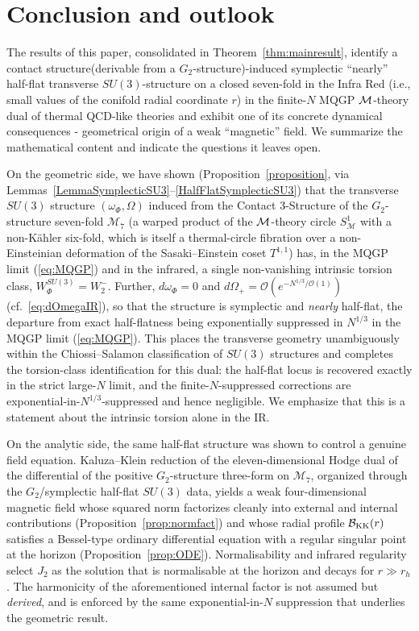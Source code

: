 \documentclass[a4paper,11pt,fleqn]{article}
\theoremstyle{plain}
\theoremstyle{definition}
\begin{document}
\section{Conclusion and outlook}
\label{Conclusion}

The results of this paper, consolidated in Theorem~\ref{thm:mainresult}, identify a contact structure(derivable from a $G_2$-structure)-induced symplectic ``nearly'' half-flat transverse
$SU(3)$-structure on a closed seven-fold in the Infra Red (i.e., small values of the conifold radial coordinate $r$) in the finite-$N$ MQGP ${\cal M}$-theory dual of thermal QCD-like theories and exhibit one of its concrete dynamical consequences - geometrical origin of a weak ``magnetic'' field. We summarize the
mathematical content and indicate the questions it leaves open.

On the geometric side, we have shown
(Proposition~\ref{proposition}, via
Lemmas~\ref{LemmaSymplecticSU3}--\ref{HalfFlatSymplecticSU3}) that the transverse $SU(3)$
structure $(\omega_\Phi,\Omega)$ induced from the Contact 3-Structure of the $G_2$-structure
seven-fold $\mathcal{M}_7$ (a warped product of the ${\cal M}$-theory circle $S^1_{\mathcal{M}}$ with a non-K\"{a}hler six-fold, which is itself a thermal-circle fibration over a non-Einsteinian deformation of the Sasaki--Einstein coset $T^{1,1}$) has, in the MQGP limit (\ref{eq:MQGP}) and in the infrared, a single non-vanishing
intrinsic torsion class, $W_\Phi^{SU(3)} = W_2^-$. Further, $d\omega_\Phi = 0$ and
$d\Omega_+ = \mathcal{O}\!\left(e^{-N^{1/3}/\mathcal{O}(1)}\right)$ (cf.\ \eqref{eq:dOmegaIR}), so that the
structure is symplectic and \emph{nearly} half-flat, the departure from exact half-flatness
being exponentially suppressed in $N^{1/3}$ in the MQGP limit (\ref{eq:MQGP}). This places the transverse geometry unambiguously within the
Chiossi--Salamon classification of $SU(3)$ structures and completes the torsion-class
identification for this dual: the half-flat locus is recovered exactly in the strict large-$N$
limit, and the finite-$N$-suppressed corrections are exponential-in-$N^{1/3}$-suppressed and hence negligible. We emphasize that this is a statement about the intrinsic torsion alone in the IR.

On the analytic side, the same half-flat structure was shown to control a genuine field
equation. Kaluza--Klein reduction of the eleven-dimensional Hodge dual of the differential of the positive $G_2$-structure three-form on $\mathcal{M}_7$,
organized through the $G_2$/symplectic half-flat $SU(3)$ data, yields a weak four-dimensional
magnetic field whose squared norm factorizes cleanly into external and internal contributions
(Proposition~\ref{prop:normfact}) and whose radial profile $\mathcal{B}_{\rm KK}(r)$ satisfies a
Bessel-type ordinary differential equation with a regular singular point at the horizon
(Proposition~\ref{prop:ODE}). Normalisability and infrared regularity select
$J_2$  as the solution that is normalisable at the horizon
and decays for $r\gg r_h$. The harmonicity of the aforementioned internal factor is not assumed but \emph{derived}, and is enforced by the same exponential-in-$N$ suppression that underlies the geometric result.
\end{document}
